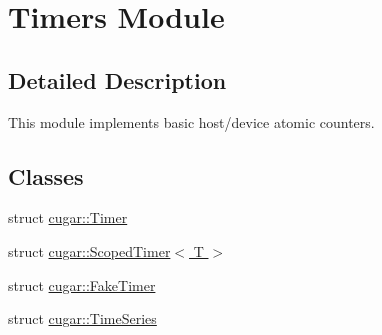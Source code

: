 \hypertarget{group___timers_module}{}\section{Timers Module}
\label{group___timers_module}


\subsection{Detailed Description}
This module implements basic host/device atomic counters. \subsection*{Classes}
\begin{DoxyCompactItemize}
\item 
struct \hyperlink{structcugar_1_1_timer}{cugar\+::\+Timer}
\item 
struct \hyperlink{structcugar_1_1_scoped_timer}{cugar\+::\+Scoped\+Timer$<$ T $>$}
\item 
struct \hyperlink{structcugar_1_1_fake_timer}{cugar\+::\+Fake\+Timer}
\item 
struct \hyperlink{structcugar_1_1_time_series}{cugar\+::\+Time\+Series}
\end{DoxyCompactItemize}
